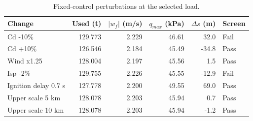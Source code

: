 \begin{table}[htbp]
\centering\small
\caption{Fixed-control perturbations at the selected load.}
\label{tab:sensitivity}
\begin{tabularx}{\linewidth}{@{}Xrrrrl@{}}
\toprule
Change & Used (t) & $|w_f|$ (m/s) & $q_{max}$ (kPa) & $\Delta s$ (m) & Screen \\
\midrule
Cd -10\% & 129.773 & 2.229 & 46.61 & 32.0 & Fail \\
Cd +10\% & 126.546 & 2.184 & 45.49 & -34.8 & Pass \\
Wind x1.25 & 128.004 & 2.197 & 45.56 & 1.5 & Pass \\
Isp -2\% & 129.755 & 2.226 & 45.55 & -12.9 & Fail \\
Ignition delay 0.7 s & 127.778 & 2.200 & 49.55 & 69.0 & Pass \\
Upper scale 5 km & 128.078 & 2.203 & 45.94 & 0.7 & Pass \\
Upper scale 10 km & 128.078 & 2.203 & 45.94 & -1.2 & Pass \\
\bottomrule
\end{tabularx}
\par{}
\end{table}
